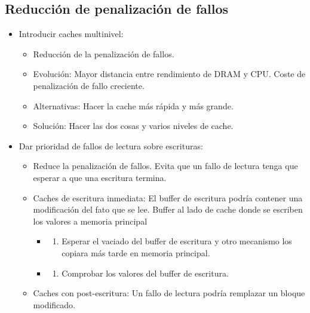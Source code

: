 \documentclass[12pt, twoside, openright]{report} %
\begin{document}
\subsection{Reducción de penalización de fallos}

  \begin{itemize}
  
  \item
    Introducir caches multinivel:

    \begin{itemize}
    
    \item
      Reducción de la penalización de fallos.
    \item
      Evolución: Mayor distancia entre rendimiento de DRAM y CPU. Coste
      de penalización de fallo creciente.
    \item
      Alternativas: Hacer la cache más rápida y más grande.
    \item
      Solución: Hacer las dos cosas y varios niveles de cache.
    \end{itemize}
    \pagebreak
  \item
    Dar prioridad de fallos de lectura sobre escrituras:

    \begin{itemize}
    
    \item
      Reduce la penalización de fallos. Evita que un fallo de lectura
      tenga que esperar a que una escritura termina.
    \item
      Caches de escritura inmediata: El buffer de escritura podría
      contener una modificación del fato que se lee. Buffer al lado de
      cache donde se escriben los valores a memoria principal

      \begin{itemize}
      \item
        \begin{enumerate}
        \def\labelenumi{\alph{enumi})}
        
        \item
          Esperar el vaciado del buffer de escritura y otro mecanismo
          los copiara más tarde en memoria principal.
        \end{enumerate}
      \item
        \begin{enumerate}
        \def\labelenumi{\alph{enumi})}
        \setcounter{enumi}{1}
        
        \item
          Comprobar los valores del buffer de escritura.
        \end{enumerate}
      \end{itemize}
    \item
      Caches con post-escritura: Un fallo de lectura podría remplazar un
      bloque modificado.


\end{itemize}
\end{itemize}
\end{document}
